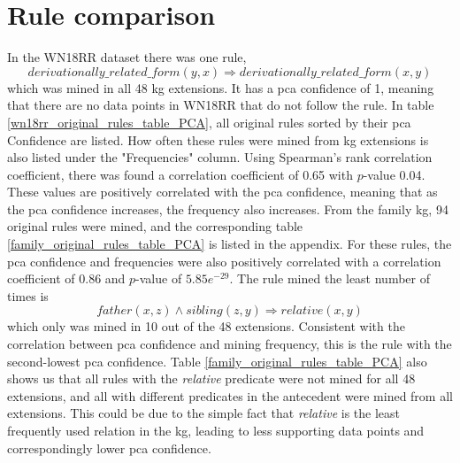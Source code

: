 \newpage
\section{Rule comparison}
In the WN18RR dataset there was one rule, 
\[derivationally\_related\_form(y, x) \Rightarrow derivationally\_related\_form(x, y)\]
which was mined in all 48 \gls{kg} extensions. It has a \gls{pca} confidence of 1, meaning that there are no data points in WN18RR that do not follow the rule. In table \ref{wn18rr_original_rules_table_PCA}, all original rules sorted by their \gls{pca} Confidence are listed. How often these rules were mined from \gls{kg} extensions is also listed under the "Frequencies" column. Using Spearman's rank correlation coefficient, there was found a correlation coefficient of 0.65 with $p$-value 0.04. These values are positively correlated with the \gls{pca} confidence, meaning that as the \gls{pca} confidence increases, the frequency also increases. From the family \gls{kg}, 94 original rules were mined, and the corresponding table \ref{family_original_rules_table_PCA} is listed in the appendix. For these rules, the \gls{pca} confidence and frequencies were also positively correlated with a correlation coefficient of 0.86 and $p$-value of $5.85e^{-29}$. The rule mined the least number of times is
\[father(x,z) \wedge sibling(z, y) \Rightarrow relative(x, y)\]
which only was mined in 10 out of the 48 extensions. Consistent with the correlation between \gls{pca} confidence and mining frequency, this is the rule with the second-lowest \gls{pca} confidence. Table \ref{family_original_rules_table_PCA} also shows us that all rules with the \textit{relative} predicate were not mined for all 48 extensions, and all with different predicates in the antecedent were mined from all extensions. This could be due to the simple fact that \textit{relative} is the least frequently used relation in the \gls{kg}, leading to less supporting data points and correspondingly lower \gls{pca} confidence.



